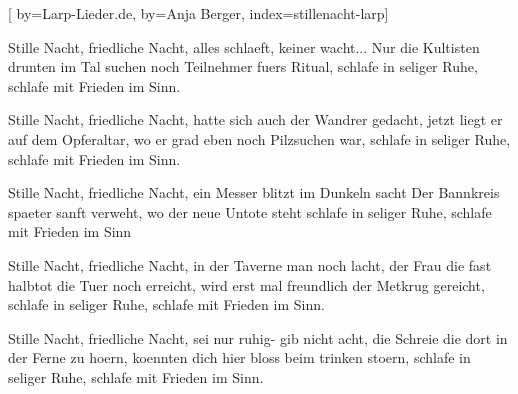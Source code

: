 

[%
    by={Larp-Lieder.de},
    by={Anja Berger},
    index={stillenacht-larp}]


    \label{stillenacht-larp}

    \beginverse
        Stille Nacht, friedliche Nacht,
        alles schlaeft, keiner wacht...
        Nur die Kultisten drunten im Tal
        suchen noch Teilnehmer fuers Ritual,
        schlafe in seliger Ruhe,
        schlafe mit Frieden im Sinn.
    \endverse

    \beginverse
        Stille Nacht, friedliche Nacht,
        hatte sich auch der Wandrer gedacht,
        jetzt liegt er auf dem Opferaltar,
        wo er grad eben noch Pilzsuchen war,
        schlafe in seliger Ruhe,
        schlafe mit Frieden im Sinn.
    \endverse

    \beginverse
        Stille Nacht, friedliche Nacht,
        ein Messer blitzt im Dunkeln sacht
        Der Bannkreis spaeter sanft verweht,
        wo der neue Untote steht
        schlafe in seliger Ruhe,
        schlafe mit Frieden im Sinn
    \endverse

    \beginverse
        Stille Nacht, friedliche Nacht,
        in der Taverne man noch lacht,
        der Frau die fast halbtot die Tuer noch erreicht,
        wird erst mal freundlich der Metkrug gereicht,
        schlafe in seliger Ruhe,
        schlafe mit Frieden im Sinn.
    \endverse

    \beginverse
        Stille Nacht, friedliche Nacht,
        sei nur ruhig- gib nicht acht,
        die Schreie die dort in der Ferne zu hoern,
        koennten dich hier bloss beim trinken stoern,
        schlafe in seliger Ruhe,
        schlafe mit Frieden im Sinn.
    \endverse
\endsong
